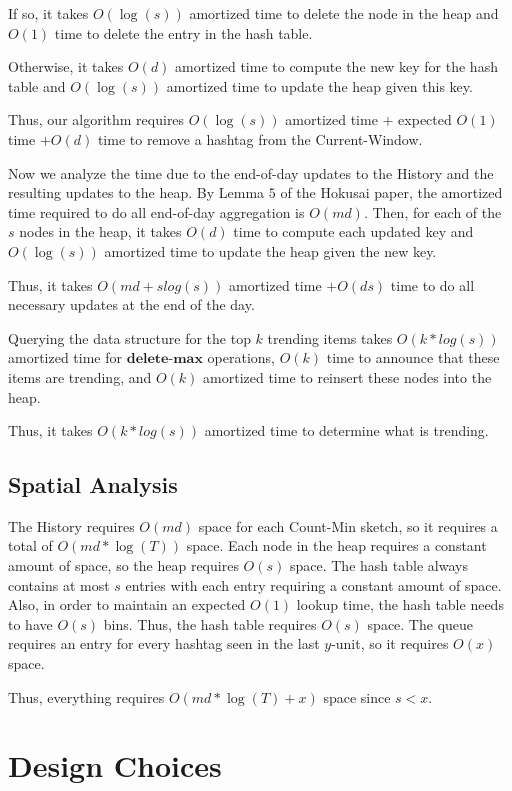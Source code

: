 \documentclass[twoside]{article}
\begin{document}
{If so, it takes $O(\log(s))$ amortized time to delete the node in the heap and $O(1)$ time to delete the entry in the hash table.

Otherwise, it takes $O(d)$ amortized time to compute the new key for the hash table and $O(\log(s))$ amortized time to update the heap given this key.

Thus, our algorithm requires $O(\log(s))$ amortized time $+$ expected $O(1)$ time  $+ O(d)$ time to remove a hashtag from the Current-Window.

Now we analyze the time due to the end-of-day updates to the History and the resulting updates to the heap. By Lemma $5$ of the Hokusai paper, the amortized time required to do all end-of-day aggregation is $O(md)$. Then, for each of the $s$ nodes in the heap, it takes $O(d)$ time to compute each updated key and $O(\log(s))$ amortized time to update the heap given the new key.

Thus, it takes $O(md + slog(s))$ amortized time $+ O(ds)$ time to do all necessary updates at the end of the day.

Querying the data structure for the top $k$ trending items takes $O(k*log(s))$ amortized time for $\textbf{delete-max}$ operations, $O(k)$ time to announce that these items are trending, and $O(k)$ amortized time to reinsert these nodes into the heap.

Thus, it takes $O(k*log(s))$ amortized time to determine what is trending.


\subsection{Spatial Analysis}

The History requires $O(md)$ space for each Count-Min sketch, so it requires a total of $O(md*\log(T))$ space.
Each node in the heap requires a constant amount of space, so the heap requires $O(s)$ space.
The hash table always contains at most $s$ entries with each entry requiring a constant amount of space.  Also, in order to maintain an expected $O(1)$ lookup time, the hash table needs to have $O(s)$ bins.  Thus, the hash table requires $O(s)$ space.
The queue requires an entry for every hashtag seen in the last $y$-unit, so it requires $O(x)$ space.

Thus, everything requires $O(md*\log(T) + x)$ space since $s < x$.


\section{Design Choices}

}
\end{document}

